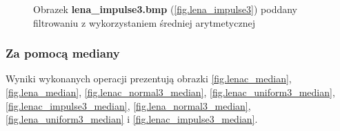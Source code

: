 \documentclass{classrep}
\begin{document}
\begin{figure}
{{  \label{fig.lena_impulse3_average_5x5}
 }
}
\caption{Obrazek \textbf{lena\_impulse3.bmp} (\ref{fig.lena_impulse3}) poddany filtrowaniu z wykorzystaniem średniej arytmetycznej}
\label{fig.lena_impulse3_average}
\end{figure}

\subsubsection{Za pomocą mediany}
Wyniki wykonanych operacji prezentują obrazki \ref{fig.lenac_median}, \ref{fig.lena_median}, \ref{fig.lenac_normal3_median}, \ref{fig.lenac_uniform3_median}, \ref{fig.lenac_impulse3_median}, \ref{fig.lena_normal3_median}, \ref{fig.lena_uniform3_median} i \ref{fig.lenac_impulse3_median}.

\end{document}
